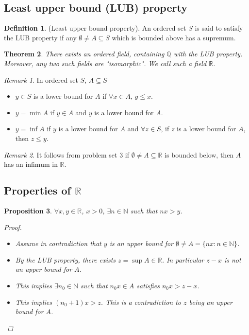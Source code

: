 \documentclass[10pt]{article}
\newcommand{\N}{\mathbb{N}}
\newcommand{\R}{\mathbb{R}}
\newcommand{\Q}{\mathbb{Q}}
\newtheorem{theorem}{Theorem}[section]
\newtheorem{proposition}[theorem]{Proposition}
\theoremstyle{definition}
\newtheorem{definition}[theorem]{Definition}
\theoremstyle{remark}
\newtheorem*{remark}{Remark}
\begin{document}
\subsection{Least upper bound (LUB) property}

\begin{definition}
    (Least upper bound property).
    An ordered set $S$ is said to satisfy the LUB property if any $\emptyset \neq A \subseteq S$ which is bounded above has a supremum.
\end{definition}

\begin{theorem}
    There exists an ordered field, containing $\Q$ with the LUB property. Moreover, any two such fields are "isomorphic". We call such a field $\R$.
\end{theorem}

\begin{remark}
    In ordered set $S$, $A \subseteq S$
    \begin{itemize}
        \item $y \in S$ is a lower bound for $A$ if $\forall x \in A$, $y \leq x$.
        \item $y = \min A$ if $y \in A$ and $y$ is a lower bound for $A$.
        \item $y = \inf A$ if $y$ is a lower bound for $A$ and $\forall z \in S$, if $z$ is a lower bound for $A$, then $z \leq y$.
    \end{itemize}
\end{remark}

\begin{remark}
    It follows from problem set 3 if $\emptyset \neq A \subseteq \R$ is bounded below, then $A$ has an infimum in $\R$.
\end{remark}

\subsection{Properties of $\R$}

\begin{proposition}
    $\forall x, y \in \R$, $x > 0$, $\exists n \in \N$ such that $nx > y$.
    \begin{proof}
        \begin{itemize}
            \item
        Assume in contradiction that $y$ is an upper bound for $\emptyset \neq A = \{nx \colon n \in \N\}$.
            \item
        By the LUB property, there exists $z = \sup A \in \R$. In particular $z - x$ is not an upper bound for $A$.
            \item
        This implies $\exists n_0 \in \N$ such that $n_0x \in A$ satisfies $n_0x > z - x$.
            \item
        This implies $(n_0 + 1)x > z$. This is a contradiction to $z$ being an upper bound for $A$.
        \end{itemize}
    \end{proof}
\end{proposition}
\end{document}
